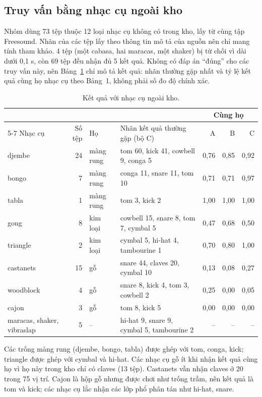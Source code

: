 \documentclass[11pt,a4paper]{article}
\begin{document}
\subsection{Truy vấn bằng nhạc cụ ngoài kho}\label{sec:ngoaikho}
Nhóm dùng 73 tệp thuộc 12 loại nhạc cụ không có trong kho, lấy từ cùng tập Freesound. Nhãn của các tệp lấy theo thông tin mô tả của nguồn nên chỉ mang tính tham khảo. 4 tệp (một cabasa, hai maracas, một shaker) bị từ chối vì dài dưới 0,1 s, còn 69 tệp đều nhận đủ 5 kết quả. Không có đáp án ``đúng'' cho các truy vấn này, nên Bảng~\ref{tab:ngoaikho} chỉ mô tả kết quả: nhãn thường gặp nhất và tỷ lệ kết quả cùng họ nhạc cụ theo Bảng~1, không phải số đo độ chính xác.
\begin{table}[htbp]
\centering\small
\caption{Kết quả với nhạc cụ ngoài kho.}\label{tab:ngoaikho}
\begin{tabularx}{\textwidth}{lrlXrrr}
\toprule
& & & & \multicolumn{3}{c}{Cùng họ}\\\cmidrule(lr){5-7}
Nhạc cụ & Số tệp & Họ & Nhãn kết quả thường gặp (bộ C) & A & B & C\\\midrule
djembe & 24 & màng rung & tom 60, kick 41, cowbell 9, conga 5 & 0,76 & 0,85 & 0,92\\
bongo & 7 & màng rung & conga 11, snare 11, tom 10 & 0,71 & 0,71 & 0,97\\
tabla & 1 & màng rung & tom 3, kick 2 & 1,00 & 1,00 & 1,00\\
gong & 8 & kim loại & cowbell 15, snare 8, tom 7, cymbal 5 & 0,47 & 0,68 & 0,50\\
triangle & 2 & kim loại & cymbal 5, hi-hat 4, tambourine 1 & 0,70 & 0,80 & 1,00\\
castanets & 15 & gỗ & snare 44, claves 20, cymbal 10 & 0,13 & 0,08 & 0,27\\
woodblock & 4 & gỗ & snare 8, kick 4, tom 3, cowbell 2 & 0,25 & 0,00 & 0,05\\
cajon & 3 & gỗ & tom 8, kick 5 & 0,00 & 0,00 & 0,00\\
maracas, shaker, vibraslap & 5 & -- & hi-hat 9, snare 9, cymbal 5, tambourine 2 & -- & -- & --\\\bottomrule
\end{tabularx}
\end{table}
Các trống màng rung (djembe, bongo, tabla) được ghép với tom, conga, kick; triangle được ghép với cymbal và hi-hat. Các nhạc cụ gỗ ít khi nhận kết quả cùng họ vì họ này trong kho chỉ có claves (13 tệp). Castanets vẫn nhận claves ở 20 trong 75 vị trí. Cajon là hộp gỗ nhưng được chơi như trống trầm, nên kết quả là tom và kick; các nhạc cụ lắc nhận các lớp phổ phân tán như hi-hat, snare.
\end{document}
